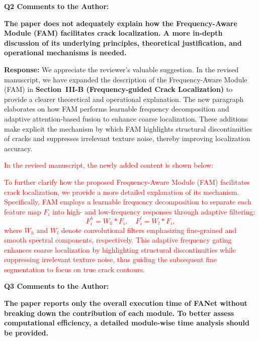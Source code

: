 \documentclass[lettersize,journal,onecolumn,12pt]{IEEEtran}
\begin{document}






 {\color{BlueGreen} \textbf{Q2 Comments to the Author:}

\textbf{The paper does not adequately explain how the Frequency-Aware Module (FAM) facilitates crack localization. A more in-depth discussion of its underlying principles, theoretical justification, and operational mechanisms is needed.}} 

\textbf{Response:}
We appreciate the reviewer’s valuable suggestion. 
In the revised manuscript, we have expanded the description of the Frequency-Aware Module (FAM) in \textbf{Section~III-B (Frequency-guided Crack Localization)} to provide a clearer theoretical and operational explanation. 
The new paragraph elaborates on how FAM performs learnable frequency decomposition and adaptive attention-based fusion to enhance coarse localization. 
These additions make explicit the mechanism by which FAM highlights structural discontinuities of cracks and suppresses irrelevant texture noise, thereby improving localization accuracy.

\textcolor{red}{In the revised manuscript, the newly added content is shown below:}

\textcolor{red}{
To further clarify how the proposed Frequency-Aware Module (FAM) facilitates crack localization, we provide a more detailed explanation of its mechanism. 
Specifically, FAM employs a learnable frequency decomposition to separate each feature map $F_i$ into high- and low-frequency responses through adaptive filtering:
\begin{equation}
F_i^{h} = W_h * F_i, \quad F_i^{l} = W_l * F_i,
\end{equation}
where $W_h$ and $W_l$ denote convolutional filters emphasizing fine-grained and smooth spectral components, respectively. 
This adaptive frequency gating enhances coarse localization by highlighting structural discontinuities while suppressing irrelevant texture noise, thus guiding the subsequent fine segmentation to focus on true crack contours.
}\\ [10pt]







{\color{BlueGreen} \textbf{Q3 Comments to the Author:}

\textbf{The paper reports only the overall execution time of FANet without breaking down the contribution of each module. 
To better assess computational efficiency, a detailed module-wise time analysis should be provided.}} 
\end{document}
